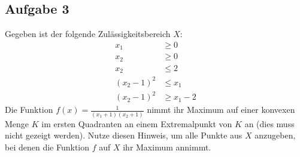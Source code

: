 \documentclass{article}
\begin{document}
\subsection*{Aufgabe 3} Gegeben ist der folgende Zulässigkeitsbereich $X$:
\begin{align*}
x_1 &\geq 0\\
x_2 &\geq 0\\
x_2 &\leq 2\\
(x_2-1)^2 &\leq x_1\\
(x_2 -1)^2 &\geq x_1-2
\end{align*}
Die Funktion $f(x) = \frac{1}{(x_1+1)(x_2+1)}$ nimmt ihr Maximum auf einer konvexen Menge $K$ im ersten Quadranten an einem Extremalpunkt von $K$ an (dies muss nicht gezeigt werden). Nutze diesen Hinweis, um alle Punkte aus $X$ anzugeben, bei denen die Funktion $f$ auf $X$ ihr Maximum annimmt. \par \medskip
\end{document}
